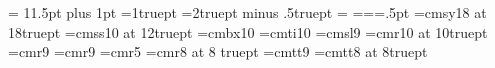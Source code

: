 \def\plainline#1{\hbox to \hsize{#1}}
\def\sin{\hbox{\rm sin}}
\def\cos{\hbox{\rm cos}}
\baselineskip = 11.5pt plus 1pt
\lineskiplimit=1truept
\lineskip=2truept minus .5truept
\newdimen\spread
\newdimen\myeqwidth
\myeqwidth=\hsize
\newdimen\mydp
\newdimen\myhtt
\newdimen\mydpp
\newdimen\mywidth
\newdimen\myht
\newdimen\allht
\newdimen\dimtwofive
\newdimen\pagewidth
\newdimen\pageheight
\newdimen{}
\pagewidth=\hsize \pageheight=\vsize {}=.5pt
\spread=2pt
\def\bestbreak{\par\penalty-9000}
\font\odd=cmsy18 at 18truept
\font\Lrm=cmss10 at 12truept 
\font\Lbf=cmbx10 %
\font\Lit=cmti10 %
\font\slsmall=cmsl9 %
\font\tenrm=cmr10 at 10truept
\font\rmsmall=cmr9
\font\ninerm=cmr9 
\font\fiverm=cmr5 
\font\eightrm=cmr8 at 8 truept
\font\ttexample=cmtt9
\font\tteight=cmtt8 at 8truept
\newfam\boldfam

\def\supereject{\newpage}




\def\bs{\char92}

\def\sloppy{\tolerance 2000 \hfuzz .5pt \vfuzz .5pt}
\def\fussy{\tolerance 200 \hfuzz .1pt \vfuzz .1pt}

